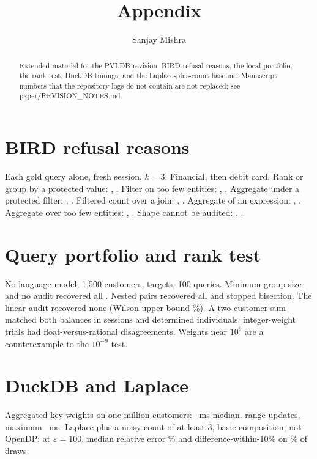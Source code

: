 \documentclass[sigconf,nonacm]{acmart}
\begin{document}
\title{Appendix}
\author{Sanjay Mishra}
\begin{abstract}
Extended material for the PVLDB revision: BIRD refusal reasons, the local portfolio, the rank test, DuckDB timings, and the Laplace-plus-count baseline. Manuscript numbers that the repository logs do not contain are not replaced; see paper/REVISION\_NOTES.md.
\end{abstract}
\maketitle
\vldbtopmatter
\section{BIRD refusal reasons}
Each gold query alone, fresh session, $k=3$. Financial, then debit card. Rank or group by a protected value: \Nfincatrank, \Ndebitcatrank. Filter on too few entities: \Nfincatthreshold, \Ndebitcatthreshold. Aggregate under a protected filter: \Nfincatweighted, \Ndebitcatweighted. Filtered count over a join: \Nfincatfanout, \Ndebitcatfanout. Aggregate of an expression: \Nfincatexpression, \Ndebitcatexpression. Aggregate over too few entities: \Nfincataggregate, \Ndebitcataggregate. Shape cannot be audited: \Nfincatopaque, \Ndebitcatopaque.
\section{Query portfolio and rank test}
No language model, 1{,}500 customers, \Nrevn{} targets, 100 queries. Minimum group size and no audit recovered all \Nrevn{}. Nested pairs recovered all \Nrevn{} and stopped bisection. The linear audit recovered none (Wilson upper bound \Nrevwilson\%). A two-customer sum matched both balances in \Nrevpairsum{} sessions and determined \Nrevpairexact{} individuals. \Nrevfloattrials{} integer-weight trials had \Nrevfloatmiss{} float-versus-rational disagreements. Weights near $10^{9}$ are a counterexample to the $10^{-9}$ test.
\section{DuckDB and Laplace}
Aggregated key weights on one million customers: \Nrevduckms{}~ms median. \Nrevduckhist{} range updates, maximum \Nrevduckmax{}~ms. Laplace plus a noisy count of at least 3, basic composition, not OpenDP: at $\varepsilon=100$, median relative error \Nrevdperr\% and difference-within-10\% on \Nrevdpatt\% of draws.
\end{document}
